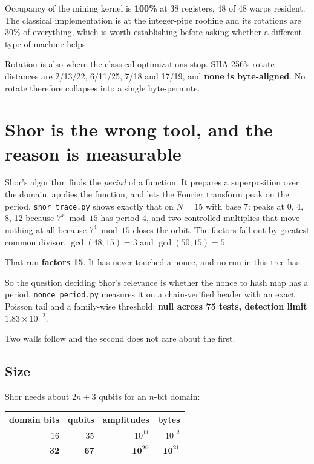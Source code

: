 Occupancy of the mining kernel is \textbf{100\%} at 38 registers, 48 of 48 warps resident. The
classical implementation is at the integer-pipe roofline and its rotations are 30\% of everything,
which is worth establishing before asking whether a different type of machine helps.

Rotation is also where the classical optimizations stop. SHA-256's rotate distances are 2/13/22,
6/11/25, 7/18 and 17/19, and \textbf{none is byte-aligned}. No rotate therefore collapses into a single
byte-permute.

\section{Shor is the wrong tool, and the reason is measurable}

Shor's algorithm finds the \emph{period} of a function. It prepares a superposition over the domain,
applies the function, and lets the Fourier transform peak on the period.
\texttt{shor\_trace.py} shows exactly that on \(N = 15\) with base 7: peaks at 0, 4, 8, 12 because
\(7^x \bmod 15\) has period 4, and two controlled multiplies that move nothing at all because
\(7^4 \bmod 15\) closes the orbit. The factors fall out by greatest common divisor,
\(\gcd(48,15) = 3\) and \(\gcd(50,15) = 5\).

That run \textbf{factors 15}. It has never touched a nonce, and no run in this tree has.

So the question deciding Shor's relevance is whether the nonce to hash map has a period.
\texttt{nonce\_period.py} measures it on a chain-verified header with an exact Poisson tail and a
family-wise threshold: \textbf{null across 75 tests, detection limit \(1.83 \times 10^{-2}\)}.

Two walls follow and the second does not care about the first.

\subsection{Size}

Shor needs about \(2n+3\) qubits for an \(n\)-bit domain:

\begin{center}
\begin{tabular}{rrrr}
\toprule
domain bits & qubits & amplitudes & bytes \\
\midrule
16 & 35 & \(10^{11}\) & \(10^{12}\) \\
\textbf{32} & \textbf{67} & \(\mathbf{10^{20}}\) & \(\mathbf{10^{21}}\) \\
\bottomrule
\end{tabular}
\end{center}


